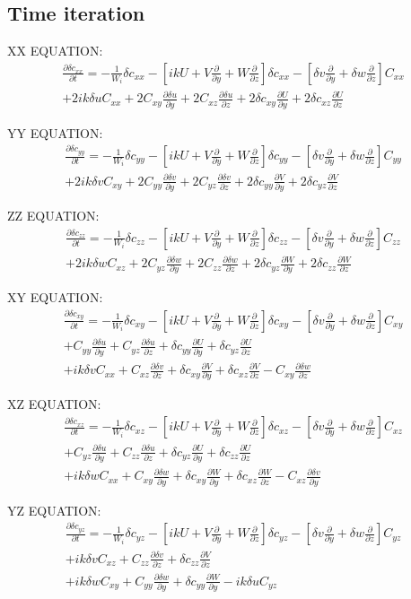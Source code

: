\documentclass[12pt,a4paper]{article}
\newcommand{\dy}[1]{\frac{\partial #1}{\partial y}}
\newcommand{\dz}[1]{\frac{\partial #1}{\partial z}}
\newcommand{\dt}[1]{\frac{\partial #1}{\partial t}}
\newcommand{\scyy}{\delta c_{yy}}
\newcommand{\sczz}{\delta c_{zz}}
\newcommand{\scxy}{\delta c_{xy}}
\newcommand{\scxz}{\delta c_{xz}}
\newcommand{\scyz}{\delta c_{yz}}
\newcommand{\su}{\delta u}
\newcommand{\sv}{\delta v}
\newcommand{\sw}{\delta w}
\newcommand{\Wi}{\frac{1}{W_{i}}}
\newcommand{\first}[2]{-\Wi \delta c_{#1 #2} - \left[ ikU
+ V\frac{\partial}{\partial y} + W\frac{\partial}{\partial z} \right] \delta c_{#1 #2} 
- \left[ \sv\frac{\partial }{\partial y} + \sw\frac{\partial }{\partial z} \right] C_{#1 #2}}
\begin{document}
\subsection{Time iteration}

\noindent XX EQUATION:
\begin{align}
    \dt{\delta c_{xx}}  = \first{x}{x} \nonumber\\
+ 2ik\su C_{xx} + 2C_{xy} \dy{\su} + 2C_{xz} \dz{\su} + 2\scxy \dy{U} + 2\scxz \dz{U}
\end{align}

\noindent YY EQUATION:
\begin{align}
    \dt{\delta c_{yy}} = \first{y}{y} \nonumber\\
+ 2ik\sv C_{xy} + 2C_{yy}\dy{\sv} + 2C_{yz}\dz{\sv} + 2\scyy \dy{V} + 2\scyz \dz{V}
\end{align}

\noindent ZZ EQUATION:
\begin{align}
    \dt{\delta c_{zz}} = \first{z}{z} \nonumber\\
+ 2ik\sw C_{xz} + 2C_{yz}\dy{\sw} + 2C_{zz}\dz{\sw} + 2\scyz \dy{W} + 2\sczz \dz{W}
\end{align}

\noindent XY EQUATION:
\begin{align}
    \dt{ \delta c_{xy}} = \first{x}{y} \nonumber\\
 + C_{yy}\dy{\su} + C_{yz}\dz{\su} + \scyy \dy{U} + \scyz \dz{U} \nonumber\\
 + ik\sv C_{xx} + C_{xz}\dz{\sv} + \scxy \dy{V} + \scxz \dz{V} - C_{xy}\dz{\sw}
\end{align}

\noindent XZ EQUATION:
\begin{align}
    \dt{ \delta c_{xz}} = \first{x}{z} \nonumber\\
+ C_{yz}\dy{\su} + C_{zz}\dz{\su} + \scyz \dy{U} + \sczz \dz{U} \nonumber\\
+ ik\sw C_{xx} + C_{xy}\dy{\sw} + \scxy \dy{W} + \scxz \dz{W} - C_{xz}\dy{\sv}
\end{align}

\noindent YZ EQUATION:
\begin{align}
    \dt{ \delta c_{yz}} = \first{y}{z} \nonumber\\
+ ik\sv C_{xz} + C_{zz}\dz{\sv} + \sczz \dz{V} \nonumber\\
+ ik\sw C_{xy} + C_{yy}\dy{\sw} + \scyy \dy{W} - ik\su C_{yz}
\end{align}
\end{document}
